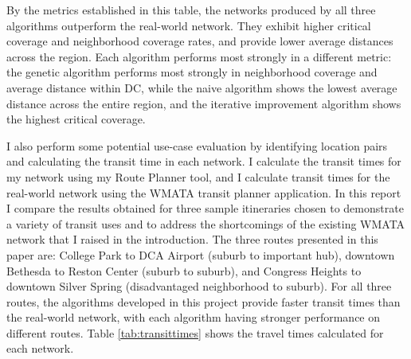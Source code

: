 \documentclass[sigconf,nonacm]{acmart}
\begin{document}
\begin{table}[h]
\caption{Comparison of Network Designs on Key Metrics}
\label{tab:networkmetrics}
\end{table}

By the metrics established in this table, the networks produced by all three algorithms outperform the real-world network. They exhibit higher critical coverage and neighborhood coverage rates, and provide lower average distances across the region. Each algorithm performs most strongly in a different metric: the genetic algorithm performs most strongly in neighborhood coverage and average distance within DC, while the naive algorithm shows the lowest average distance across the entire region, and the iterative improvement algorithm shows the highest critical coverage. 

I also perform some potential use-case evaluation by identifying location pairs and calculating the transit time in each network. I calculate the transit times for my network using my Route Planner tool, and I calculate transit times for the real-world network using the WMATA transit planner application. In this report I compare the results obtained for three sample itineraries chosen to demonstrate a variety of transit uses and to address the shortcomings of the existing WMATA network that I raised in the introduction. The three routes presented in this paper are: College Park to DCA Airport (suburb to important hub), downtown Bethesda to Reston Center (suburb to suburb), and Congress Heights to downtown Silver Spring (disadvantaged neighborhood to suburb). For all three routes, the algorithms developed in this project provide faster transit times than the real-world network, with each algorithm having stronger performance on different routes. Table \ref{tab:transittimes} shows the travel times calculated for each network. 
\end{document}
